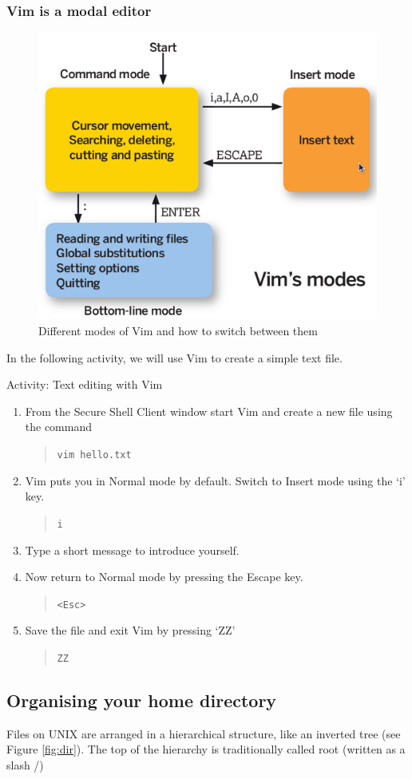 \documentclass[a4paper]{beamer}
\newcommand{\ftitle}[1]{\frametitle<presentation>{#1}}
\newcommand{\cmd}[1]{\begin{quote}{\tt #1}\end{quote}}
\begin{document}
\begin{frame}
\ftitle{Vim is a modal editor}
\begin{figure}
\begin{center}
\includegraphics[scale=0.4]{vim_modes}
\end{center}
\caption{Different modes of Vim and how to switch between them}
\label{fig:vim_modes}
\end{figure}
\end{frame}

In the following activity, we will use Vim to create a simple text file. 

\begin{frame}{Activity: Text editing with Vim}
\begin{enumerate}
\item From the Secure Shell Client window start Vim and create a new file using
the command \cmd{vim hello.txt}
\item Vim puts you in Normal mode by default. Switch to Insert mode using the
`i' key. \cmd{i} 
\item Type a short message to introduce yourself.
\item Now return to Normal mode by pressing the Escape key. \cmd{<Esc>} 
\item Save the file and exit Vim by pressing `ZZ' \cmd{ZZ}
\end{enumerate}
\end{frame}

\subsection{Organising your home directory}
Files on UNIX are arranged in a hierarchical structure, like an inverted tree
(see Figure \ref{fig:dir}).  The top of the hierarchy is traditionally called
root (written as a slash /)
\end{document}
